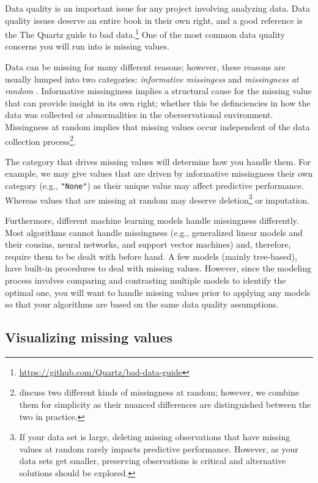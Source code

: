 \documentclass[]{krantz}
\begin{document}
Data quality is an important issue for any project involving analyzing data. Data quality issues deserve an entire book in their own right, and a good reference is the The Quartz guide to bad data.\footnote{\url{https://github.com/Quartz/bad-data-guide}} One of the most common data quality concerns you will run into is missing values.

Data can be missing for many different reasons; however, these reasons are usually lumped into two categories: \emph{informative missingess} \citep{apm} and \emph{missingness at random} \citep{little2014statistical}. Informative missinginess implies a structural cause for the missing value that can provide insight in its own right; whether this be definciencies in how the data was collected or abnormalities in the oberservational environment. Missingness at random implies that missing values occur independent of the data collection process\footnote{\citet{little2014statistical} discuss two different kinds of missingness at random; however, we combine them for simplicity as their nuanced differences are distinguished between the two in practice.}.

The category that drives missing values will determine how you handle them. For example, we may give values that are driven by informative missingness their own category (e.g., \texttt{"None"}) as their unique value may affect predictive performance. Whereas values that are missing at random may deserve deletion\footnote{If your data set is large, deleting missing observations that have missing values at random rarely impacts predictive performance. However, as your data sets get smaller, preserving observations is critical and alternative solutions should be explored.} or imputation.

Furthermore, different machine learning models handle missingness differently. Most algorithms cannot handle missingness (e.g., generalized linear models and their cousins, neural networks, and support vector machines) and, therefore, require them to be dealt with before hand. A few models (mainly tree-based), have built-in procedures to deal with missing values. However, since the modeling process involves comparing and contrasting multiple models to identify the optimal one, you will want to handle missing values prior to applying any models so that your algorithms are based on the same data quality assumptions.

\hypertarget{visualizing-missing-values}{%
\subsection{Visualizing missing values}\label{visualizing-missing-values}}
\end{document}
